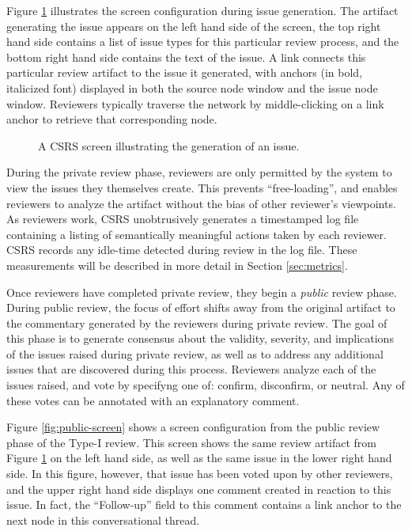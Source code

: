 Figure \ref{fig:issue-screen} illustrates the screen configuration during
issue generation.  The artifact generating the issue appears on the left
hand side of the screen, the top right hand side contains a list of issue
types for this particular review process, and the bottom right hand side
contains the text of the issue.  A link connects this particular review
artifact to the issue it generated, with anchors (in bold, italicized font)
displayed in both the source node window and the issue node window.
Reviewers typically traverse the network by middle-clicking on a link
anchor to retrieve that corresponding node.

\begin{figure}
 {\centerline{}}
\caption{A CSRS screen illustrating the generation of an issue.}
\label{fig:issue-screen}
\end{figure}

During the private review phase, reviewers are only permitted by
the system to view the issues they themselves create.  This prevents
``free-loading'', and enables reviewers to analyze the artifact without the
bias of other reviewer's viewpoints.  As reviewers work, CSRS unobtrusively
generates a timestamped log file containing a listing of semantically
meaningful actions taken by each reviewer. CSRS records any idle-time
detected during review in the log file. These measurements will be
described in more detail in Section \ref{sec:metrics}.

Once reviewers have completed private review, they begin a {\em public}
review phase.  During public review, the focus of effort shifts away from
the original artifact to the commentary generated by the reviewers during
private review. The goal of this phase is to generate consensus about the
validity, severity, and implications of the issues raised during private
review, as well as to address any additional issues that are discovered
during this process.  Reviewers analyze each of the issues raised, and vote
by specifyng one of: confirm, disconfirm, or neutral.  Any of these votes
can be annotated with an explanatory comment.

Figure \ref{fig:public-screen} shows a screen configuration from the
public review phase of the Type-I review.  This screen shows the same
review artifact from Figure \ref{fig:issue-screen} on the left hand side,
as well as the same issue in the lower right hand side.  In this figure,
however, that issue has been voted upon by other reviewers, and the upper
right hand side displays one comment created in reaction to this issue.  In
fact, the ``Follow-up'' field to this comment contains a link anchor to the
next node in this conversational thread.

